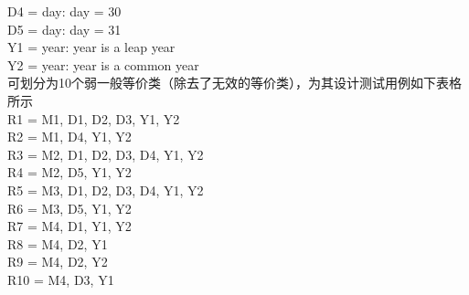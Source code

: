 \documentclass{article}
\newcommand{\blue}{\begin{tabular}{|l|c|c|c|r|}
\hline
  a & b & c & 测试输出 & 预期输出\\
\hline

  

\end{tabular}}
\newcommand{\bluetitle}{三角形弱健壮测试数据1}
\begin{document}
D4 = {day: day = 30}\\

D5 = {day: day = 31}\\

Y1 = {year: year is a leap year}\\

Y2 = {year: year is a common year}\\

可划分为10个弱一般等价类（除去了无效的等价类），为其设计测试用例如下表格所示\\

R1 = {M1, {D1, D2, D3}, {Y1, Y2}}\\

R2 = {M1, D4, {Y1, Y2}}\\

R3 = {M2, {D1, D2, D3, D4}, {Y1, Y2}}\\

R4 = {M2, D5, {Y1, Y2}}\\

R5 = {M3, {D1, D2, D3, D4}, {Y1, Y2}}\\

R6 = {M3, D5, {Y1, Y2}}\\

R7 = {M4, D1, {Y1, Y2}}\\

R8 = {M4, D2, Y1}\\

R9 = {M4, D2, Y2}\\

R10 = {M4, D3, Y1}\\

\begin{center}
\renewcommand{\blue}{\begin{tabular}{|l|c|c|c|r|}
  \hline
  y & m & d & 测试输出 & 预期输出\\
  \hline

  

\end{tabular}}
\renewcommand{\bluetitle}{NextDay弱健壮测试数据1}



\renewcommand{\blue}{\begin{tabular}{|l|c|c|c|r|}
  \hline
  y & m & d & 测试输出 & 预期输出\\
  \hline

  

\end{tabular}}
\renewcommand{\bluetitle}{NextDay强健壮测试数据2}



\end{center}
\end{document}
